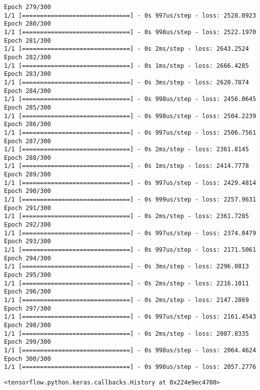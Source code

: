 \documentclass[11pt]{article}
\makeatletter
\newcommand{\boxspacing}{\kern\kvtcb@left@rule\kern\kvtcb@boxsep}
\newcommand{\prompt}[4]{
        \ttfamily\llap{{\color{#2}[#3]:\hspace{3pt}#4}}\vspace{-\baselineskip}
    }
\makeatother
\begin{document}
\begin{Verbatim}[commandchars=\\\{\}]
Epoch 279/300
1/1 [==============================] - 0s 997us/step - loss: 2528.0923
Epoch 280/300
1/1 [==============================] - 0s 998us/step - loss: 2522.1970
Epoch 281/300
1/1 [==============================] - 0s 2ms/step - loss: 2643.2524
Epoch 282/300
1/1 [==============================] - 0s 1ms/step - loss: 2666.4285
Epoch 283/300
1/1 [==============================] - 0s 3ms/step - loss: 2620.7874
Epoch 284/300
1/1 [==============================] - 0s 998us/step - loss: 2456.0645
Epoch 285/300
1/1 [==============================] - 0s 998us/step - loss: 2504.2239
Epoch 286/300
1/1 [==============================] - 0s 997us/step - loss: 2506.7561
Epoch 287/300
1/1 [==============================] - 0s 2ms/step - loss: 2361.8145
Epoch 288/300
1/1 [==============================] - 0s 1ms/step - loss: 2414.7778
Epoch 289/300
1/1 [==============================] - 0s 997us/step - loss: 2429.4814
Epoch 290/300
1/1 [==============================] - 0s 999us/step - loss: 2257.9631
Epoch 291/300
1/1 [==============================] - 0s 2ms/step - loss: 2361.7285
Epoch 292/300
1/1 [==============================] - 0s 997us/step - loss: 2374.0479
Epoch 293/300
1/1 [==============================] - 0s 997us/step - loss: 2171.5061
Epoch 294/300
1/1 [==============================] - 0s 3ms/step - loss: 2296.0813
Epoch 295/300
1/1 [==============================] - 0s 2ms/step - loss: 2216.1011
Epoch 296/300
1/1 [==============================] - 0s 2ms/step - loss: 2147.2869
Epoch 297/300
1/1 [==============================] - 0s 997us/step - loss: 2161.4543
Epoch 298/300
1/1 [==============================] - 0s 2ms/step - loss: 2087.8335
Epoch 299/300
1/1 [==============================] - 0s 998us/step - loss: 2064.4624
Epoch 300/300
1/1 [==============================] - 0s 998us/step - loss: 2057.2776
    \end{Verbatim}

            \begin{tcolorbox}[breakable, size=fbox, boxrule=.5pt, pad at break*=1mm, opacityfill=0]
\prompt{Out}{outcolor}{44}{\boxspacing}
\begin{Verbatim}[commandchars=\\\{\}]
<tensorflow.python.keras.callbacks.History at 0x224e9ec4700>
\end{Verbatim}
\end{tcolorbox}
        
\end{document}
